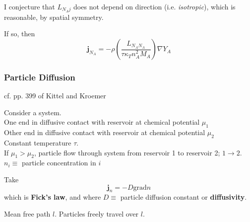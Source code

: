 \documentclass[10pt]{amsart}
\begin{document}
\begin{multicols*}{2}
I conjecture that $L_{N_Aj}$ does not depend on direction (i.e. \emph{isotropic}), which is reasonable, by spatial symmetry.  

If so, then
\begin{equation}\label{Eq:diffusionfluxsinglespeciesisotropic}
\mathbf{j}_{N_A} = -\rho \left( \frac{L_{N_A N_A}}{ \tau \kappa_T n_A^2 M_A} \right) \nabla Y_A
\end{equation}



\subsubsection{Particle Diffusion}

cf. pp. 399 of Kittel and Kroemer \cite{CKittelHKroemer1980}

Consider a system.  \\
One end in diffusive contact with reservoir at chemical potential $\mu_1$ \\
Other end in diffusive contact with reservoir at chemical potential $\mu_2$ \\
Constant temperature $\tau$.  \\
If $\mu_1 > \mu_2$, particle flow through system from reservoir 1 to reservoir 2; $1\to 2$.   \\
$n_i \equiv $ particle concentration in $i$ 

Take
\begin{equation}\label{Eq:Fickslaw}
\mathbf{j}_n = -D \text{grad}n
\end{equation}
which is \textbf{Fick's law}, and where $D \equiv$ particle diffusion constant or \textbf{diffusivity}.  

Mean free path $l$.  Particles freely travel over $l$.  


\end{multicols*}
\end{document}
